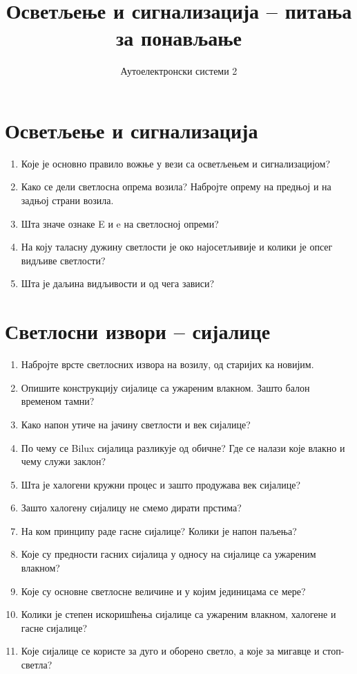 \documentclass{article}
\title{Осветљење и сигнализација -- питања за понављање}
\author{Аутоелектронски системи 2}
\date{}
\begin{document}
\maketitle

\section*{Осветљење и сигнализација}
\begin{enumerate}[series=pitanja, label=\arabic*.]
    \item Које је основно правило вожње у вези са осветљењем и сигнализацијом?
    \item Како се дели светлосна опрема возила? Набројте опрему на предњој и на задњој страни возила.
    \item Шта значе ознаке E и e на светлосној опреми?
    \item На коју таласну дужину светлости је око најосетљивије и колики је опсег видљиве светлости?
    \item Шта је даљина видљивости и од чега зависи?
\end{enumerate}

\section*{Светлосни извори -- сијалице}
\begin{enumerate}[resume*=pitanja]
    \item Набројте врсте светлосних извора на возилу, од старијих ка новијим.
    \item Опишите конструкцију сијалице са ужареним влакном. Зашто балон временом тамни?
    \item Како напон утиче на јачину светлости и век сијалице?
    \item По чему се Bilux сијалица разликује од обичне? Где се налази које влакно и чему служи заклон?
    \item Шта је халогени кружни процес и зашто продужава век сијалице?
    \item Зашто халогену сијалицу не смемо дирати прстима?
    \item На ком принципу раде гасне сијалице? Колики је напон паљења?
    \item Које су предности гасних сијалица у односу на сијалице са ужареним влакном?
    \item Које су основне светлосне величине и у којим јединицама се мере?
    \item Колики је степен искоришћења сијалице са ужареним влакном, халогене и гасне сијалице?
    \item Које сијалице се користе за дуго и оборено светло, а које за мигавце и стоп-светла?
\end{enumerate}
\end{document}
